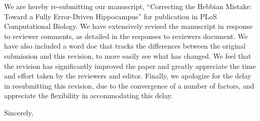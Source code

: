 \documentclass[11pt]{letter}
\begin{document}
\begin{letter}
{\vspace*{-.25in}}

\opening{\vspace*{.25in}}

We are hereby re-submitting our manuscript, ``Correcting the Hebbian Mistake: Toward a Fully Error-Driven Hippocampus'' for publication in PLoS Computational Biology.  We have extensively revised the manuscript in response to reviewer comments, as detailed in the responses to reviewers document.  We have also included a word doc that tracks the differences between the original submission and this revision, to more easily see what has changed.  We feel that the revision has significantly improved the paper and greatly appreciate the time and effort taken by the reviewers and editor.  Finally, we apologize for the delay in resubmitting this revision, due to the convergence of a number of factors, and appreciate the flexibility in accommodating this delay.

\closing{Sincerely,}


\end{letter}
\end{document}
